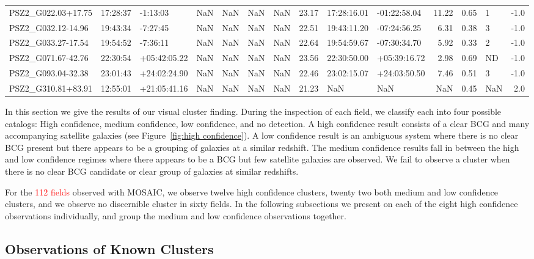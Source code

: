 \documentclass[apj, revtex4]{emulateapj}
\newcommand{\editorial}[1]{\textcolor{red}{#1}}
\begin{document}
\begin{table}
\begin{tabular}{lllrrrrrllrrlr}
 PSZ2\_G022.03+17.75 &  17:28:37 &      -1:13:03 & NaN &  NaN &   NaN &  NaN &    23.17 &   17:28:16.01 &  -01:22:58.04 &    11.22 &  0.65 &    1 &  -1.0 \\
 PSZ2\_G032.12-14.96 &  19:43:34 &      -7:27:45 & NaN &  NaN &   NaN &  NaN &    22.51 &   19:43:11.20 &  -07:24:56.25 &     6.31 &  0.38 &    3 &  -1.0 \\
 PSZ2\_G033.27-17.54 &  19:54:52 &      -7:36:11 & NaN &  NaN &   NaN &  NaN &    22.64 &   19:54:59.67 &  -07:30:34.70 &     5.92 &  0.33 &    2 &  -1.0 \\
 PSZ2\_G071.67-42.76 &  22:30:54 &  +05:42:05.22 & NaN &  NaN &   NaN &  NaN &    23.56 &   22:30:50.00 &  +05:39:16.72 &     2.98 &  0.69 &   ND &  -1.0 \\
 PSZ2\_G093.04-32.38 &  23:01:43 &  +24:02:24.90 & NaN &  NaN &   NaN &  NaN &    22.46 &   23:02:15.07 &  +24:03:50.50 &     7.46 &  0.51 &    3 &  -1.0 \\
 PSZ2\_G310.81+83.91 &  12:55:01 &  +21:05:41.16 & NaN &  NaN &   NaN &  NaN &    21.23 &           NaN &           NaN &      NaN &  0.45 &  NaN &   2.0 \\
	\hline
\end{tabular}
\label{tbl:preobserved} 
\end{table}

In this section we give the results of our visual cluster finding. During the inspection of each field, we classify each into four possible catalogs: High confidence, medium confidence, low confidence, and no detection. A high confidence result consists of a clear BCG and many accompanying satellite galaxies (see Figure~\ref{fig:high confidence}). A low confidence result is an ambiguous system where there is no clear BCG present but there appears to be a grouping of galaxies at a similar redshift. The medium confidence results fall in between the high and low confidence regimes where there appears to be a BCG but few satellite galaxies are observed. We fail to observe a cluster when there is no clear BCG candidate or clear group of galaxies at similar redshifts.

For the \editorial{112 fields} observed with MOSAIC, we observe twelve high confidence clusters, twenty two both medium and low confidence clusters, and we observe no discernible cluster in sixty fields. In the following subsections we present on each of the eight high confidence observations individually, and group the medium and low confidence observations together.


\subsection{Observations of Known Clusters}
\end{document}
